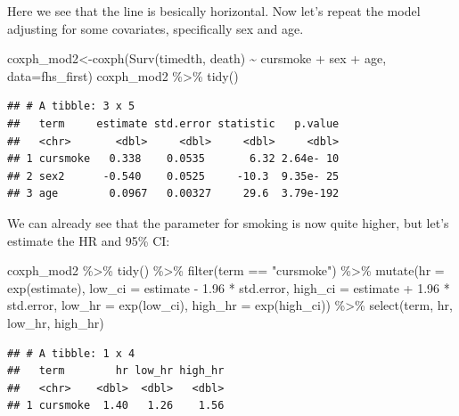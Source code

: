 \documentclass[
]{book}
\newenvironment{Shaded}{\begin{snugshade}}{\end{snugshade}}
\newcommand{\AttributeTok}[1]{\textcolor[rgb]{0.77,0.63,0.00}{#1}}
\newcommand{\FloatTok}[1]{\textcolor[rgb]{0.00,0.00,0.81}{#1}}
\newcommand{\FunctionTok}[1]{\textcolor[rgb]{0.00,0.00,0.00}{#1}}
\newcommand{\NormalTok}[1]{#1}
\newcommand{\OtherTok}[1]{\textcolor[rgb]{0.56,0.35,0.01}{#1}}
\newcommand{\SpecialCharTok}[1]{\textcolor[rgb]{0.00,0.00,0.00}{#1}}
\newcommand{\StringTok}[1]{\textcolor[rgb]{0.31,0.60,0.02}{#1}}
\begin{document}
Here we see that the line is besically horizontal. Now let's repeat the model adjusting for some covariates, specifically sex and age.

\begin{Shaded}
\begin{Highlighting}[]
\NormalTok{coxph\_mod2}\OtherTok{\textless{}{-}}\FunctionTok{coxph}\NormalTok{(}\FunctionTok{Surv}\NormalTok{(timedth, death) }\SpecialCharTok{\textasciitilde{}}\NormalTok{ cursmoke }\SpecialCharTok{+}\NormalTok{ sex }\SpecialCharTok{+}\NormalTok{ age, }\AttributeTok{data=}\NormalTok{fhs\_first)}
\NormalTok{coxph\_mod2 }\SpecialCharTok{\%\textgreater{}\%}
\FunctionTok{tidy}\NormalTok{()}
\end{Highlighting}
\end{Shaded}

\begin{verbatim}
## # A tibble: 3 x 5
##   term     estimate std.error statistic   p.value
##   <chr>       <dbl>     <dbl>     <dbl>     <dbl>
## 1 cursmoke   0.338    0.0535       6.32 2.64e- 10
## 2 sex2      -0.540    0.0525     -10.3  9.35e- 25
## 3 age        0.0967   0.00327     29.6  3.79e-192
\end{verbatim}

We can already see that the parameter for smoking is now quite higher, but let's estimate the HR and 95\% CI:

\begin{Shaded}
\begin{Highlighting}[]
\NormalTok{coxph\_mod2 }\SpecialCharTok{\%\textgreater{}\%} 
  \FunctionTok{tidy}\NormalTok{() }\SpecialCharTok{\%\textgreater{}\%} 
  \FunctionTok{filter}\NormalTok{(term }\SpecialCharTok{==} \StringTok{"cursmoke"}\NormalTok{) }\SpecialCharTok{\%\textgreater{}\%} 
  \FunctionTok{mutate}\NormalTok{(}\AttributeTok{hr =} \FunctionTok{exp}\NormalTok{(estimate),}
         \AttributeTok{low\_ci =}\NormalTok{ estimate }\SpecialCharTok{{-}} \FloatTok{1.96} \SpecialCharTok{*}\NormalTok{ std.error, }
         \AttributeTok{high\_ci =}\NormalTok{ estimate }\SpecialCharTok{+} \FloatTok{1.96} \SpecialCharTok{*}\NormalTok{ std.error, }
         \AttributeTok{low\_hr =} \FunctionTok{exp}\NormalTok{(low\_ci), }
         \AttributeTok{high\_hr =} \FunctionTok{exp}\NormalTok{(high\_ci)) }\SpecialCharTok{\%\textgreater{}\%} 
  \FunctionTok{select}\NormalTok{(term, hr, low\_hr, high\_hr)}
\end{Highlighting}
\end{Shaded}

\begin{verbatim}
## # A tibble: 1 x 4
##   term        hr low_hr high_hr
##   <chr>    <dbl>  <dbl>   <dbl>
## 1 cursmoke  1.40   1.26    1.56
\end{verbatim}
\end{document}
